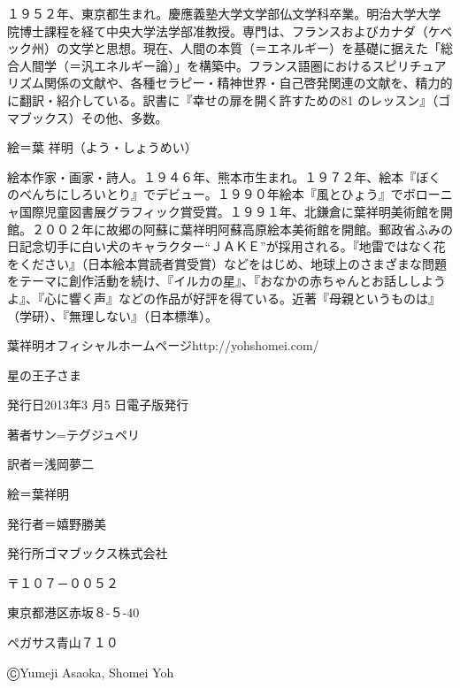 １９５２年、東京都生まれ。慶應義塾大学文学部仏文学科卒業。明治大学大学院博士課程を経て中央大学法学部准教授。専門は、フランスおよびカナダ（ケベック州）の文学と思想。現在、人間の本質（＝エネルギー）を基礎に据えた「総合人間学（＝汎エネルギー論）」を構築中。フランス語圏におけるスピリチュアリズム関係の文献や、各種セラピー・精神世界・自己啓発関連の文献を、精力的に翻訳・紹介している。訳書に『幸せの扉を開く許すための81 のレッスン』（ゴマブックス）その他、多数。
\stopmakeup
\startmakeup[title]

絵＝葉 祥明（よう・しょうめい）

絵本作家・画家・詩人。１９４６年、熊本市生まれ。１９７２年、絵本『ぼくのべんちにしろいとり』でデビュー。１９９０年絵本『風とひょう』でボローニャ国際児童図書展グラフィック賞受賞。１９９１年、北鎌倉に葉祥明美術館を開館。２００２年に故郷の阿蘇に葉祥明阿蘇高原絵本美術館を開館。郵政省ふみの日記念切手に白い犬のキャラクター“ＪＡＫＥ”が採用される。『地雷ではなく花をください』（日本絵本賞読者賞受賞）などをはじめ、地球上のさまざまな問題をテーマに創作活動を続け、『イルカの星』、『おなかの赤ちゃんとお話ししようよ』、『心に響く声』などの作品が好評を得ている。近著『母親というものは』（学研）、『無理しない』（日本標準）。

葉祥明オフィシャルホームページhttp://yohshomei.com/
\stopmakeup

\startmakeup[title]

星の王子さま

発行日2013年3 月5 日電子版発行

著者サン=テグジュペリ

訳者＝浅岡夢二

絵＝葉祥明

発行者＝嬉野勝美

発行所ゴマブックス株式会社

〒１０７－００５２

東京都港区赤坂８-５-40

ペガサス青山７１０

ⒸYumeji Asaoka, Shomei Yoh
\stopmakeup